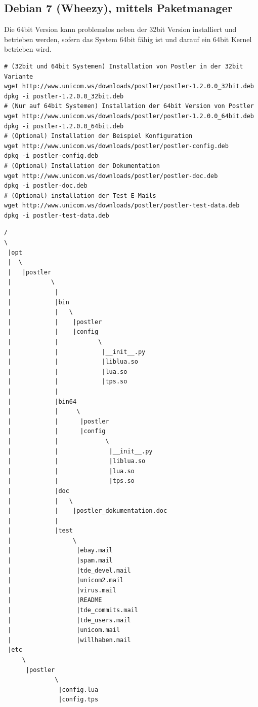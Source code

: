 \documentclass[a4paper,10pt]{article}
\begin{document}
\subsection{Debian 7 (Wheezy), mittels Paketmanager}

Die 64bit Version kann problemslos neben der 32bit Version installiert und betrieben werden, sofern das System 64bit fähig ist und darauf ein 64bit Kernel betrieben wird.

\begin{lstlisting}[style=bash,caption={Installation unter Debian 7 (Wheezy)}]
# (32bit und 64bit Systemen) Installation von Postler in der 32bit Variante
wget http://www.unicom.ws/downloads/postler/postler-1.2.0.0_32bit.deb
dpkg -i postler-1.2.0.0_32bit.deb
# (Nur auf 64bit Systemen) Installation der 64bit Version von Postler
wget http://www.unicom.ws/downloads/postler/postler-1.2.0.0_64bit.deb
dpkg -i postler-1.2.0.0_64bit.deb
# (Optional) Installation der Beispiel Konfiguration
wget http://www.unicom.ws/downloads/postler/postler-config.deb
dpkg -i postler-config.deb
# (Optional) Installation der Dokumentation
wget http://www.unicom.ws/downloads/postler/postler-doc.deb
dpkg -i postler-doc.deb
# (Optional) installation der Test E-Mails
wget http://www.unicom.ws/downloads/postler/postler-test-data.deb
dpkg -i postler-test-data.deb
\end{lstlisting}

\begin{lstlisting}[caption={Ordnerstruktur unter Debian}]
/
\
 |opt
 |  \
 |   |postler
 |           \
 |            |
 |            |bin
 |            |   \
 |            |    |postler
 |            |    |config
 |            |           \
 |            |            |__init__.py
 |            |            |liblua.so
 |            |            |lua.so
 |            |            |tps.so
 |            |
 |            |bin64
 |            |     \
 |            |      |postler
 |            |      |config
 |            |             \
 |            |              |__init__.py
 |            |              |liblua.so
 |            |              |lua.so
 |            |              |tps.so
 |            |doc
 |            |   \
 |            |    |postler_dokumentation.doc
 |            |
 |            |test
 |                 \
 |                  |ebay.mail
 |                  |spam.mail
 |                  |tde_devel.mail
 |                  |unicom2.mail
 |                  |virus.mail
 |                  |README
 |                  |tde_commits.mail
 |                  |tde_users.mail
 |                  |unicom.mail
 |                  |willhaben.mail
 |etc
     \
      |postler
              \
               |config.lua
               |config.tps

\end{lstlisting}
\end{document}
